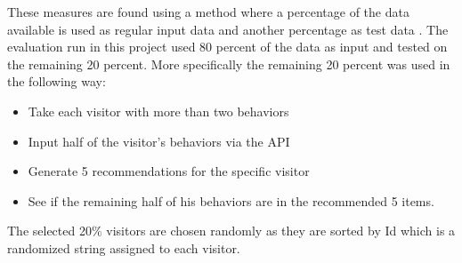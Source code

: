 These measures are found using a method where a percentage of the data available is used as regular input data and another percentage as test data \cite{eval}. The evaluation run in this project used 80 percent of the data as input and tested on the remaining 20 percent. More specifically the remaining 20 percent was used in the following way:
\begin{itemize}
\item Take each visitor with more than two behaviors
\item Input half of the visitor's behaviors via the \gls{API}
\item Generate 5 recommendations for the specific visitor
\item See if the remaining half of his behaviors are in the recommended 5 items.
\end{itemize}
The selected 20\% visitors are chosen randomly as they are sorted by Id which is a randomized string assigned to each visitor.


